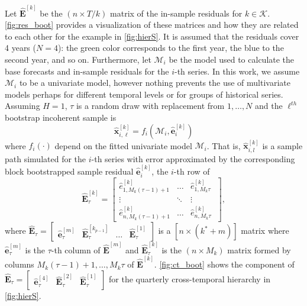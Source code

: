 \documentclass[a4paper,11pt]{article}
\newcommand{\evet}{\bm{e}}
\newcommand{\xvet}{\bm{x}}
\newcommand{\Evet}{\bm{E}}
\theoremstyle{definition}
\begin{document}
Let $\widehat{\Evet}^{[k]}$ be the $(n \times T/k)$ matrix of the in-sample residuals for $k \in \mathcal{K}$. \autoref{fig:res_boot} provides a visualization of these matrices and how they are related to each other for the example in \autoref{fig:hierS}. It is assumed that the residuals cover 4 years ($N=4$): the green color corresponds to the first year, the blue to the second year, and so on. Furthermore, let $\mathcal{M}_i$ be the model used to calculate the base forecasts and in-sample residuals for the $i$-th series. In this work, we assume $\mathcal{M}_i$ to be a univariate model, however nothing prevents the use of multivariate models perhaps for different temporal levels or for groups of historical series. Assuming $H = 1$, $\tau$ is a random draw with replacement from $1,\dots, N$ and the $\ell^{th}$ bootstrap incoherent sample is
$$
	\widehat{\xvet}_{i,\ell}^{[k]} = f_i\left(\mathcal{M}_i, \widehat{\evet}_{i}^{[k]}\right)
$$
where $f_i(\cdot)$ depend on the fitted univariate model $\mathcal{M}_i$. That is, $\widehat{\xvet}_{i,l}^{[k]}$ is a sample path simulated for the $i$-th series with error approximated by the corresponding block bootstrapped sample residual $\widehat{\evet}_{i}^{[k]}$, the $i$-th row of
$$
	\widehat{\Evet}^{[k]}_{\tau} = \begin{bmatrix}
		\widehat{e}^{[k]}_{1,M_k(\tau-1)+1} & \dots  & \widehat{e}^{[k]}_{1,M_k\tau}   \\
		\vdots                              & \ddots & \vdots                          \\
		\widehat{e}^{[k]}_{n,M_k(\tau-1)+1} & \dots  & \widehat{e}^{[k]}_{n,M_k\tau} \
	\end{bmatrix},
$$
where $\widehat{\Evet}_{\tau} = \begin{bmatrix}
		\widehat{\evet}^{[m]}_\tau & \widehat{\Evet}^{[k_{p-1}]}_{\tau} & \dots & \widehat{\Evet}^{[1]}_{\tau}
	\end{bmatrix}$ is a $[n \times (k^\ast + m)]$ matrix where $\widehat{\evet}^{[m]}_\tau$ is the $\tau$-th column of $\widehat{\Evet}^{[m]}$ and $\widehat{\Evet}^{[k]}_{\tau}$ is the $(n \times M_k)$ matrix formed by columns $M_k(\tau-1)+1,\dots, M_k \tau$ of $\widehat{\Evet}^{[k]}$. 	\autoref{fig:ct_boot} shows the component of $\widehat{\Evet}_{\tau} = \begin{bmatrix}
		\widehat{\evet}^{[4]}_\tau & \widehat{\Evet}^{[2]}_{\tau} & \widehat{\Evet}^{[1]}_{\tau}
	\end{bmatrix}$ for the quarterly cross-temporal hierarchy in \autoref{fig:hierS}.
\end{document}
